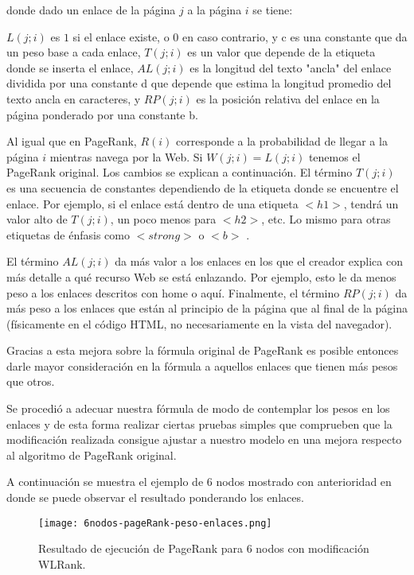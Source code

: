 donde dado un enlace de la página $j$ a la página $i$ se tiene:

$L(j; i)$ es $1$ si el enlace existe, o $0$ en caso contrario, y c es una constante que da un peso base a cada enlace,
$T(j; i)$ es un valor que depende de la etiqueta donde se inserta el enlace,
$AL(j;i)$ es la longitud del texto "ancla" del enlace dividida por una constante d que depende que estima la longitud promedio del texto ancla en caracteres, y $RP(j;i)$ es la posición relativa del enlace en la página ponderado por una constante b.

Al igual que en PageRank, $R(i)$ corresponde a la probabilidad de llegar a la página $i$ mientras navega por la Web. Si $W(j; i) = L(j; i)$ tenemos el PageRank original. Los cambios se explican a continuación. El término $T(j; i)$ es una secuencia de constantes dependiendo de la etiqueta donde se encuentre el enlace. Por ejemplo, si el enlace está dentro de una etiqueta $<h1>$, tendrá un valor alto de $T(j; i)$, un poco menos para $<h2>$, etc. Lo mismo para otras etiquetas de énfasis como $<strong>$ o $<b>$ .

El término $AL(j;i)$ da más valor a los enlaces en los que el creador explica con más detalle a qué recurso Web se está enlazando. Por ejemplo, esto le da menos peso a los enlaces descritos con home o aquí. Finalmente, el término $RP(j; i)$ da más peso a los enlaces que están al principio de la página que al final de la página (físicamente en el código HTML, no necesariamente en la vista del navegador).

Gracias a esta mejora sobre la fórmula original de PageRank es posible entonces darle mayor consideración en la fórmula a aquellos enlaces que tienen más pesos que otros.

Se procedió a adecuar nuestra fórmula de modo de contemplar los pesos en los enlaces y de esta forma realizar ciertas pruebas simples que comprueben que la modificación realizada consigue ajustar a nuestro modelo en una mejora respecto al algoritmo de PageRank original.

A continuación se muestra el ejemplo de 6 nodos mostrado con anterioridad en donde se puede observar el resultado ponderando los enlaces.

\begin{figure}
	\centering
	\texttt{[image: 6nodos-pageRank-peso-enlaces.png]}
	\caption{Resultado de ejecución de PageRank para 6 nodos con modificación WLRank.} 
	\label{fig:6nodos-pageRank-peso-enlaces}
\end{figure}

